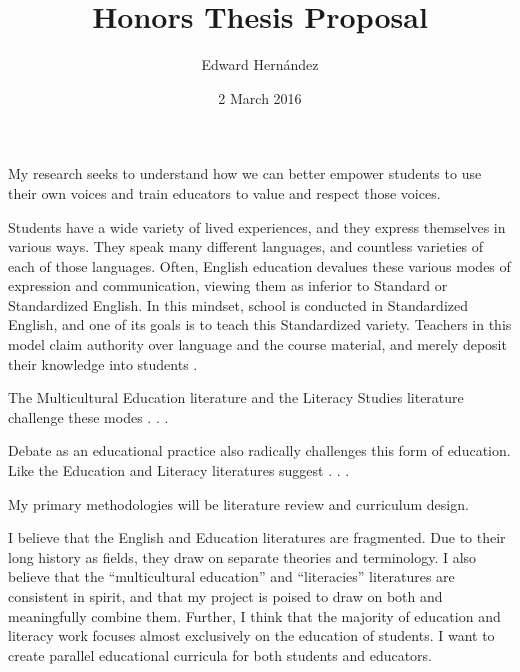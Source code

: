 \documentclass[man,12pt,natbib]{apa6}
\begin{document}
\title{Honors Thesis Proposal}
\author{Edward Hern\'{a}ndez}
\date{2 March 2016}
\maketitle

My research seeks to understand how we can better empower students to use their
own voices and train educators to value and respect those voices.

Students have a wide variety of lived experiences, and they express themselves
in various ways. They speak many different languages, and countless varieties
of each of those languages. Often, English education devalues these various
modes of expression and communication, viewing them as inferior to Standard or
Standardized English. In this mindset, school is conducted in Standardized
English, and one of its goals is to teach this Standardized variety. Teachers
in this model claim authority over language \citep{LippiGreen11} and the course
material, and merely deposit their knowledge into students \citep{Friere68}.

The Multicultural Education literature and the Literacy Studies literature
challenge these modes  . . .

Debate as an educational practice also radically challenges this form of
education. Like the Education and Literacy literatures suggest . . .

My primary methodologies will be literature review and curriculum design.

I believe that the English and Education literatures are fragmented. Due to
their long history as fields, they draw on separate theories and terminology. I
also believe that the ``multicultural education'' and ``literacies''
literatures are consistent in spirit, and that my project is poised to draw on
both and meaningfully combine them.
Further, I think that the majority of education and literacy work focuses
almost exclusively on the education of students. I want to create parallel
educational curricula for both students and educators.

\end{document}
